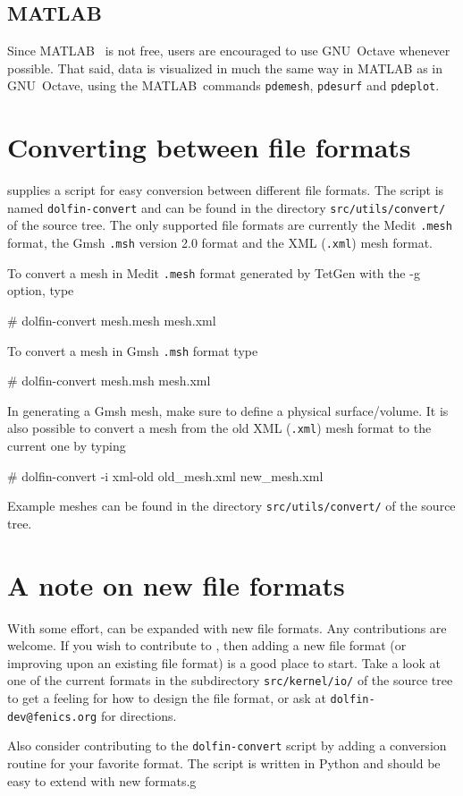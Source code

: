 \subsection{MATLAB}

Since MATLAB~\cite{www:MATLAB} is not free, users are encouraged to
use GNU~Octave whenever possible. That said, data is visualized in
much the same way in MATLAB as in GNU~Octave, using the
MATLAB~commands \texttt{pdemesh}, \texttt{pdesurf} and
\texttt{pdeplot}.

\section{Converting between file formats}

\dolfin{} supplies a script for easy conversion between different file
formats.  The script is named \texttt{dolfin-convert} and can be found
in the directory \texttt{src/utils/convert/} of the \dolfin{} source
tree. The only supported file formats are currently the Medit
\texttt{.mesh} format, the Gmsh \texttt{.msh} version 2.0 format and the 
\dolfin{} XML (\texttt{.xml}) mesh format.

To convert a mesh in Medit \texttt{.mesh} format generated by TetGen 
with the -g option, type
\begin{code}
# dolfin-convert mesh.mesh mesh.xml
\end{code}
%
To convert a mesh in Gmsh \texttt{.msh} format type 
\begin{code}
# dolfin-convert mesh.msh mesh.xml
\end{code}
In generating a Gmsh mesh, make sure to define a 
physical surface/volume.
%
It is also possible to convert a mesh from the old \dolfin{} XML
(\texttt{.xml}) mesh format to the current one by typing
\begin{code}
# dolfin-convert -i xml-old old_mesh.xml new_mesh.xml
\end{code}
%
Example meshes can be found in the directory
\texttt{src/utils/convert/} of the \dolfin{} source tree.

\section{A note on new file formats}

With some effort, \dolfin{} can be expanded with new file formats. Any
contributions are welcome. If you wish to contribute to \dolfin{},
then adding a new file format (or improving upon an existing file
format) is a good place to start. Take a look at one of the current
formats in the subdirectory \texttt{src/kernel/io/} of the \dolfin{}
source tree to get a feeling for how to design the file format, or ask
at \texttt{dolfin-dev@fenics.org} for directions.

Also consider contributing to the \texttt{dolfin-convert} script by
adding a conversion routine for your favorite format. The script is
written in Python and should be easy to extend with new formats.g

